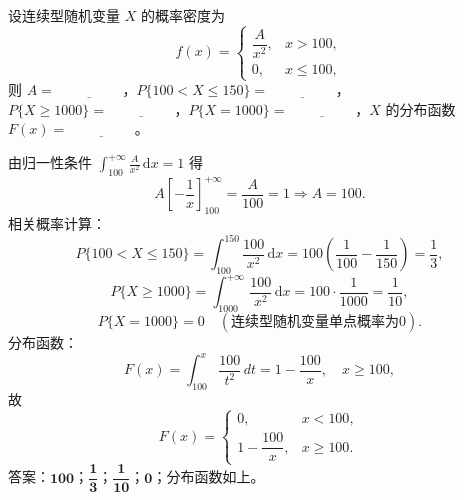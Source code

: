 ﻿\documentclass[lang=cn,11pt]{elegantbook}
\begin{document}
\begin{exercise}[连续型概率密度参数求解] \label{exer:2-37}
设连续型随机变量 $X$ 的概率密度为
\[
f(x)=
\begin{cases}
\dfrac{A}{x^2}, & x>100, \\[6pt]
0, & x\leqslant100,
\end{cases}
\]
则 $A=\underline{\hspace{2cm}}$，$P\{100<X\leqslant150\}=\underline{\hspace{2cm}}$，$P\{X\geqslant1000\}=\underline{\hspace{2cm}}$，$P\{X=1000\}=\underline{\hspace{2cm}}$，$X$ 的分布函数 $F(x)=\underline{\hspace{2cm}}$。
\end{exercise}

\begin{solution}
由归一性条件 $\displaystyle\int_{100}^{+\infty}\frac{A}{x^2}\,\mathrm{d}x=1$ 得
\[
A\left[-\frac{1}{x}\right]_{100}^{+\infty} = \frac{A}{100} = 1 \Rightarrow A=100.
\]
相关概率计算：
\[
P\{100<X\leqslant150\} = \int_{100}^{150}\frac{100}{x^2}\,\mathrm{d}x = 100\left(\frac{1}{100}-\frac{1}{150}\right) = \frac{1}{3},
\]
\[
P\{X\geqslant1000\} = \int_{1000}^{+\infty}\frac{100}{x^2}\,\mathrm{d}x = 100\cdot\frac{1}{1000} = \frac{1}{10},
\]
\[
P\{X=1000\}=0 \quad (\text{连续型随机变量单点概率为0}).
\]
分布函数：
\[
F(x) = \int_{100}^{x}\frac{100}{t^2}\,dt = 1-\frac{100}{x}, \quad x\geqslant100,
\]
故
\[
F(x)=
\begin{cases}
0, & x<100, \\[6pt]
1-\dfrac{100}{x}, & x\geqslant100.
\end{cases}
\]
答案：$\boldsymbol{100}$；$\boldsymbol{\dfrac{1}{3}}$；$\boldsymbol{\dfrac{1}{10}}$；$\boldsymbol{0}$；分布函数如上。
\end{solution}
\end{document}
